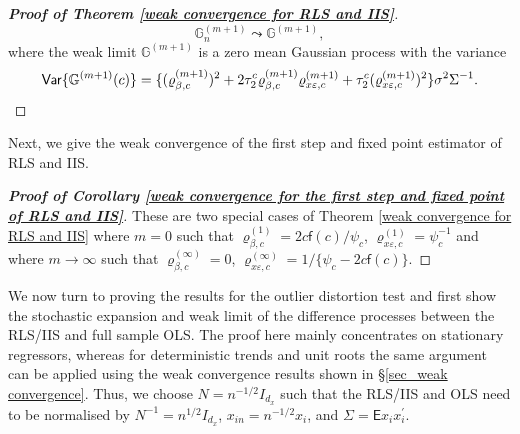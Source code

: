 \documentclass[11pt, letterpaper]{article}
\numberwithin{algorithm}{section}
\numberwithin{assumption}{section}
\numberwithin{lemma}{section}
\numberwithin{theorem}{section}
\numberwithin{corollary}{section}
\numberwithin{remark}{section}
\numberwithin{equation}{section}
\numberwithin{figure}{section}
\numberwithin{table}{section}
\begin{document}
\begin{proof}[\textnormal{\textbf{Proof of Theorem \ref{weak convergence for RLS and IIS}}}]
\begin{equation*}
\mathbb{G}_{n}^{(m + 1)} \leadsto \mathbb{G}^{(m + 1)},
\end{equation*}
where the weak limit $\mathbb{G}^{(m + 1)}$ is a zero mean Gaussian process with the variance
\begin{equation*}
\mathsf{Var} \{ \mathbb{G}^{(m + 1)}(c) \} = \{ (\varrho_{\beta, c}^{(m + 1)})^{2} + 2 \tau_{2}^{c} \varrho_{\beta, c}^{(m + 1)} \varrho_{x \varepsilon, c}^{(m + 1)} + \tau_{2}^{c} (\varrho_{x \varepsilon, c}^{(m + 1)})^{2} \} \sigma^{2} \Sigma^{-1}. \qedhere
\end{equation*}
\end{proof}

Next, we give the weak convergence of the first step and fixed point estimator of RLS and IIS.

\begin{proof}[\textnormal{\textbf{Proof of Corollary \ref{weak convergence for the first step and fixed point of RLS and IIS}}}]
These are two special cases of Theorem \ref{weak convergence for RLS and IIS} where $m = 0$ such that $\varrho_{\beta, c}^{(1)} = 2 c \mathsf{f}(c) / \psi_{c}$, $\varrho_{x \varepsilon, c}^{(1)} = \psi_{c}^{-1}$ and where $m \to \infty$ such that $\varrho_{\beta, c}^{(\infty)} = 0$, $\varrho_{x \varepsilon, c}^{(\infty)} = 1 / \{ \psi_{c} - 2 c \mathsf{f}(c) \}$.
\end{proof}

We now turn to proving the results for the outlier distortion test and first show the stochastic expansion and weak limit of the difference processes between the RLS/IIS and full sample OLS. The proof here mainly concentrates on stationary regressors, whereas for deterministic trends and unit roots the same argument can be applied using the weak convergence results shown in \S \ref{sec_weak convergence}. Thus, we choose $N = n^{-1/2} I_{d_{x}}$ such that the RLS/IIS and OLS need to be normalised by $N^{-1} = n^{1/2} I_{d_{x}}$, $x_{in} = n^{-1/2} x_{i}$, and $\Sigma = \mathsf{E} x_{i} x_{i}^{\prime}$.
\end{document}
